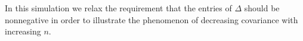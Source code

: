 \begin{remark}
In this simulation we relax the requirement that the entries of $\Delta$ should be nonnegative in order to illustrate the phenomenon of decreasing covariance with increasing $n$. 
\end{remark}

\begin{figure}[htbp]
    \centering
    \quad
    \quad
    \quad

\end{figure}
